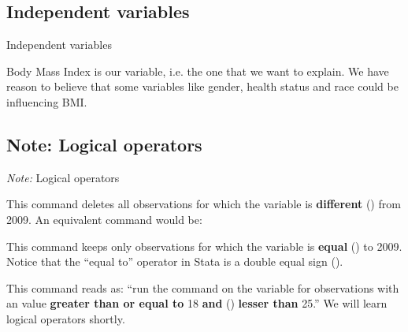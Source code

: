 \documentclass{beamer}
\begin{document}
	\subsection{Independent variables}

	\begin{frame}[t]{Independent variables}
	
		Body Mass Index is our  variable, i.e. the one that we want to explain. We have reason to believe that some  variables like gender, health status and race could be influencing BMI.\vspace{1em}
		
			
		


		
		
		
		
				
	\end{frame}

	\subsection{Note: Logical operators}

	\begin{frame}[t]{\textit{Note:} Logical operators}
			
			
			This command deletes all observations for which the variable  is \textbf{different} (\code{!=}) from 2009. An equivalent command would be:\vspace{1em}
			
					
			This command keeps only observations for which the  variable is \textbf{equal} (\code{==}) to 2009. Notice that the ``equal to'' operator in Stata is a double equal sign (\code{==}).\vspace{1em}
						
			
			This command reads as: ``run the  command on the  variable for observations with an  value \textbf{greater than or equal to} 18 \textbf{and} (\code{\&}) \textbf{lesser than} 25.'' We will learn logical operators shortly.
				
	\end{frame}
\end{document}
